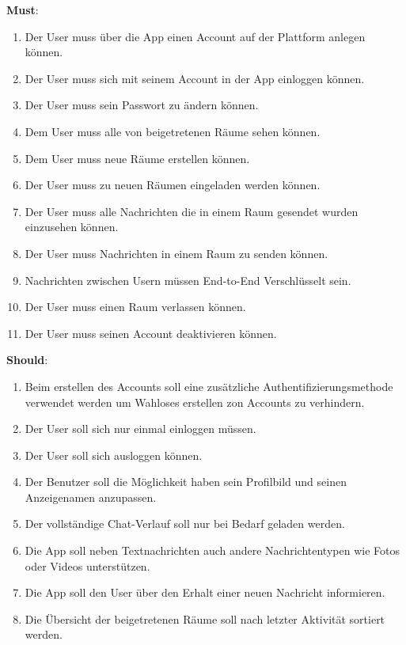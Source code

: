     \textbf{Must}:
    \begin{enumerate}[label={\roman*.}, leftmargin=2.5cm]
        \item Der User muss über die App einen Account auf der Plattform anlegen können.
        \item Der User muss sich mit seinem Account in der App einloggen können.
        \item Der User muss sein Passwort zu ändern können.
        \item Dem User muss alle von beigetretenen Räume sehen können.
        \item Dem User muss neue Räume erstellen können.
        \item Der User muss zu neuen Räumen eingeladen werden können.
        \item Der User muss alle Nachrichten die in einem Raum gesendet wurden einzusehen können.
        \item Der User muss Nachrichten in einem Raum zu senden können.
        \item Nachrichten zwischen Usern müssen End-to-End Verschlüsselt sein.
        \item Der User muss einen Raum verlassen können.
        \item Der User muss seinen Account deaktivieren können.
    \end{enumerate}


    \textbf{Should}:
    \begin{enumerate}[label={\roman*.}, leftmargin=2.5cm]
        \item Beim erstellen des Accounts soll eine zusätzliche Authentifizierungsmethode verwendet werden um Wahloses erstellen zon Accounts zu verhindern.
        \item Der User soll sich nur einmal einloggen müssen.
        \item Der User soll sich ausloggen können.
        \item Der Benutzer soll die Möglichkeit haben sein Profilbild und seinen Anzeigenamen anzupassen.
        \item Der vollständige Chat-Verlauf soll nur bei Bedarf geladen werden.
        \item Die App soll neben Textnachrichten auch andere Nachrichtentypen wie Fotos oder Videos unterstützen.
        \item Die App soll den User über den Erhalt einer neuen Nachricht informieren.
        \item Die Übersicht der beigetretenen Räume soll nach letzter Aktivität sortiert werden.
    \end{enumerate}


